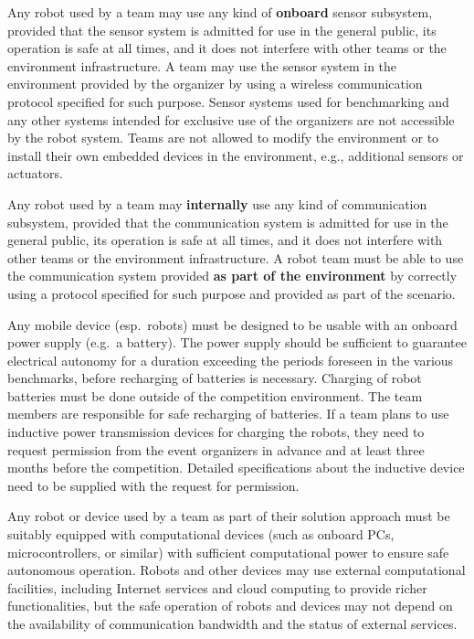 \begin{robotSpec}
Any robot used by a team may use any kind of \textbf{onboard} sensor subsystem, provided that the sensor system is admitted for use in the general public, its operation is safe at all times, and it does not interfere with other teams or the environment infrastructure. 
A team may use the sensor system in the environment provided by the organizer by using a wireless communication protocol specified for such purpose. Sensor systems used for benchmarking and any other systems intended for exclusive use of the organizers are not accessible by the robot system. 
Teams are not allowed to modify the environment or to install their own embedded devices in the environment, e.g., additional sensors or actuators.
\end{robotSpec}


\begin{robotSpec}
	Any robot used by a team may \textbf{internally} use any kind of communication subsystem, provided that the communication system is admitted for use in the general public, its operation is safe at all times, and it does not interfere with other teams or the environment infrastructure.
	A robot team must be able to use the communication system provided \textbf{as part of the environment} by correctly using a protocol specified for such purpose and provided as part of the scenario. 
\end{robotSpec}


\begin{robotSpec}
	Any mobile device (esp.~robots) must be designed to be usable with an onboard power supply (e.g.~a battery). The power supply should be sufficient to guarantee electrical autonomy for a duration exceeding the periods foreseen in the various benchmarks, before recharging of batteries is necessary.	
	Charging of robot batteries must be done outside of the competition environment. The team members are responsible for safe recharging of batteries. 
	If a team plans to use inductive power transmission devices for charging the robots, they need to request permission from the event organizers in advance and at least three months before the competition. 
	Detailed specifications about the inductive device need to be supplied with the request for permission. 
\end{robotSpec}

\begin{robotConstraint}
	Any robot or device used by a team as part of their solution approach must be suitably equipped with computational devices (such as onboard PCs, microcontrollers, or similar) with sufficient computational power to ensure safe autonomous operation. 
	Robots and other devices may use external computational facilities, including Internet services and cloud computing to provide richer functionalities, but the safe operation of robots and devices may not depend on the availability of communication bandwidth and the status of external services. 	
\end{robotConstraint}

